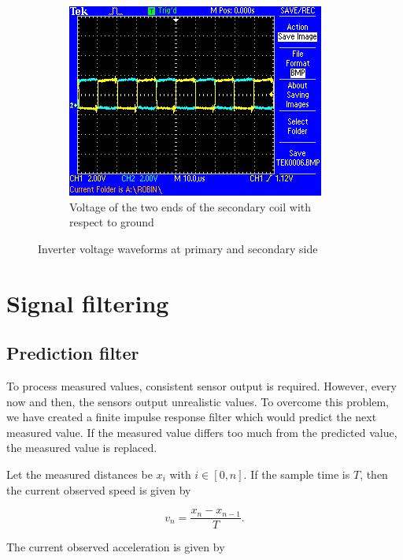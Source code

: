 \documentclass[11pt,titlepage]{report}
\begin{document}
\begin{appendices}
\begin{figure}[H]
\begin{center}
\begin{subfigure}[h]{0.48\textwidth}
			\includegraphics[width=\textwidth]{resources/osc-coil-secondary.png}
			\caption{Voltage of the two ends of the secondary coil with respect to ground}
			\label{fig:app-osc-coil-secondary}
		\end{subfigure}
	\end{center}
	\caption{Inverter voltage waveforms at primary and secondary side}
\end{figure}




\chapter{Signal filtering}
\label{app:signal-filtering}
\section{Prediction filter}
To process measured values, consistent sensor output is required. However, every now and then, the sensors output unrealistic values. To overcome this problem, we have created a finite impulse response filter which would predict the next measured value. If the measured value differs too much from the predicted value, the measured value is replaced.

Let the measured distances be $x_i$ with $i \in [0,n]$. If the sample time is $T$, then the current observed speed is given by

\begin{equation}
	v_n = \frac{x_{n} - x_{n-1}}{T}.
\end{equation}

The current observed acceleration is given by


\end{appendices}
\end{document}
